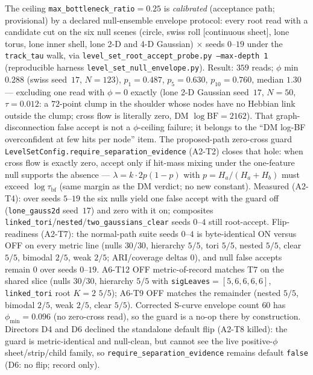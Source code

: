 \documentclass[11pt]{article}
\begin{document}
The ceiling \texttt{max\_bottleneck\_ratio}${}=0.25$ is
\emph{calibrated} (acceptance path; provisional) by a declared
null-ensemble envelope protocol: every root read with a candidate cut
on the six null scenes (circle, swiss roll [continuous sheet], lone
torus, lone inner shell, lone 2-D and 4-D Gaussian) $\times$ seeds
$0$--$19$ under the \texttt{track\_tau} walk, via
\texttt{level\_set\_root\_accept\_probe.py --max-depth 1}
(reproducible harness
\texttt{level\_set\_null\_envelope.py}). Result:
$359$ reads; $\phi$ min $0.288$ (swiss seed~$17$, $N{=}123$),
$p_1{=}0.487$, $p_5{=}0.630$, $p_{10}{=}0.760$, median $1.30$ ---
excluding one read with $\phi{=}0$ exactly (lone 2-D Gaussian
seed~$17$, $N{=}50$, $\tau{=}0.012$: a $72$-point clump in the
shoulder whose nodes have no Hebbian link outside the clump; cross
flow is literally zero, DM $\log\mathrm{BF}{=}2162$). That
graph-disconnection false accept is not a $\phi$-ceiling failure; it
belongs to the ``DM log-BF overconfident at few hits per node'' item.
The proposed-path zero-cross guard
\texttt{LevelSetConfig.require\_separation\_evidence} (A2-T2) closes that
hole: when cross flow is exactly zero, accept only if hit-mass mixing
under the one-feature null supports the absence ---
$\lambda = k\cdot 2p(1-p)$ with $p=H_a/(H_a+H_b)$ must exceed
$\log\tau_{\mathrm{bf}}$ (same margin as the DM verdict; no new
constant). Measured (A2-T4): over seeds $5$--$19$ the six nulls yield
one false accept with the guard off (\texttt{lone\_gauss2d} seed~$17$)
and zero with it on; composites
\texttt{linked\_tori}/\texttt{nested}/\texttt{two\_gaussians\_clear}
seeds $0$--$4$ still root-accept. Flip-readiness (A2-T7): the
normal-path suite seeds $0$--$4$ is byte-identical ON versus OFF on
every metric line (nulls $30/30$, hierarchy $5/5$, tori $5/5$, nested
$5/5$, clear $5/5$, bimodal $2/5$, weak $2/5$; ARI/coverage deltas
$0$), and null false accepts remain $0$ over seeds $0$--$19$.
A6-T12 OFF metric-of-record matches T7 on the shared slice (nulls
$30/30$, hierarchy $5/5$ with \texttt{sigLeaves}${}=[5,6,6,6,6]$,
\texttt{linked\_tori} root $K{=}2$ $5/5$); A6-T9 OFF matches the
remainder (nested $5/5$, bimodal $2/5$, weak $2/5$, clear $5/5$).
Corrected S-curve envelope count $60$ has $\phi_{\min}{=}0.096$ (no
zero-cross read), so the guard is a no-op there by construction.
Directors D4 and D6 declined the standalone default flip (A2-T8
killed): the guard is metric-identical and null-clean, but cannot see
the live positive-$\phi$ sheet/strip/child family, so
\texttt{require\_separation\_evidence} remains default \texttt{false}
(D6: no flip; record only).
\end{document}
